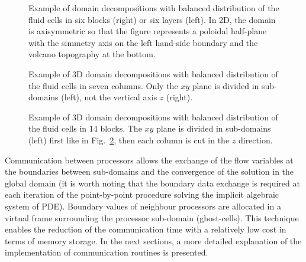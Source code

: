 %
\begin{figure}[htb]
\setlength{\unitlength}{1mm}
\begin{center}
\begin{minipage}{6cm}
\centerline{}
\end{minipage}
\end{center}
\caption{Example of domain decompositions with balanced distribution of
the fluid cells in six blocks (right) or six layers (left).
In 2D, the domain is axisymmetric so that the figure represents a poloidal
half-plane with the simmetry axis on the left hand-side boundary and
the volcano topography at the bottom.  \label{fig:Ves_part_lay}}
\end{figure}
%
\begin{figure}[htb]
\setlength{\unitlength}{1mm}
\begin{center}
\begin{minipage}{6cm}
\centerline{}
\end{minipage}
\end{center}
\caption{Example of 3D domain decompositions with balanced distribution of
the fluid cells in seven columns. Only the $xy$ plane is divided in sub-domains (left),
not the vertical axis $z$ (right). \label{fig:Ves_part_col}}
\end{figure}
%
\begin{figure}[htb]
\setlength{\unitlength}{1mm}
\begin{center}
\begin{minipage}{6cm}
\centerline{}
\end{minipage}
\end{center}
\caption{Example of 3D domain decompositions with balanced distribution of
the fluid cells in 14 blocks. The $xy$ plane is divided in sub-domains (left)
first like in Fig.~\ref{fig:Ves_part_col}, then each column is cut in 
the $z$ direction.\label{fig:Ves_part_blk}}
\end{figure}
%
Communication between processors allows the exchange of the flow variables
at the boundaries between sub-domains and the convergence of the solution
in the global domain (it is worth noting that the
boundary data exchange is required at each iteration of the point-by-point
procedure solving the implicit algebraic system of PDE).
Boundary values of neighbour processors are allocated in a virtual
frame surrounding the processor sub-domain (ghost-cells). This technique
enables the reduction of the communication time with a relatively low cost
in terms of memory storage.
In the next sections, a more detailed explanation of the implementation of communication
routines is presented.
%
